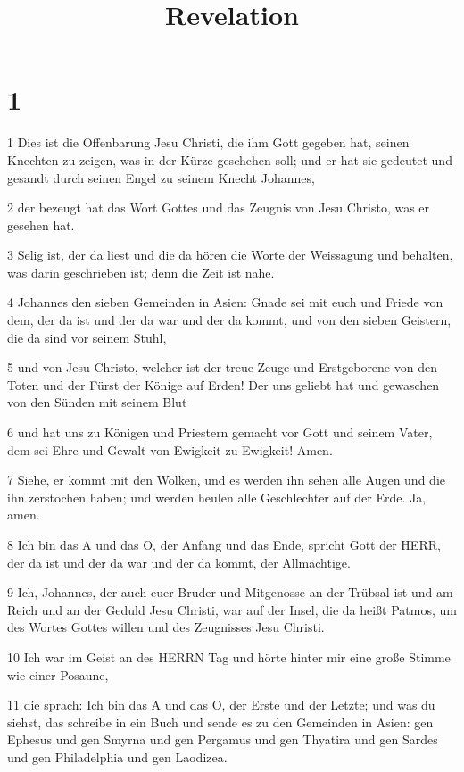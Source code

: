 

\title{Revelation}


\chapter{1}

\par 1 Dies ist die Offenbarung Jesu Christi, die ihm Gott gegeben hat, seinen Knechten zu zeigen, was in der Kürze geschehen soll; und er hat sie gedeutet und gesandt durch seinen Engel zu seinem Knecht Johannes,
\par 2 der bezeugt hat das Wort Gottes und das Zeugnis von Jesu Christo, was er gesehen hat.
\par 3 Selig ist, der da liest und die da hören die Worte der Weissagung und behalten, was darin geschrieben ist; denn die Zeit ist nahe.
\par 4 Johannes den sieben Gemeinden in Asien: Gnade sei mit euch und Friede von dem, der da ist und der da war und der da kommt, und von den sieben Geistern, die da sind vor seinem Stuhl,
\par 5 und von Jesu Christo, welcher ist der treue Zeuge und Erstgeborene von den Toten und der Fürst der Könige auf Erden! Der uns geliebt hat und gewaschen von den Sünden mit seinem Blut
\par 6 und hat uns zu Königen und Priestern gemacht vor Gott und seinem Vater, dem sei Ehre und Gewalt von Ewigkeit zu Ewigkeit! Amen.
\par 7 Siehe, er kommt mit den Wolken, und es werden ihn sehen alle Augen und die ihn zerstochen haben; und werden heulen alle Geschlechter auf der Erde. Ja, amen.
\par 8 Ich bin das A und das O, der Anfang und das Ende, spricht Gott der HERR, der da ist und der da war und der da kommt, der Allmächtige.
\par 9 Ich, Johannes, der auch euer Bruder und Mitgenosse an der Trübsal ist und am Reich und an der Geduld Jesu Christi, war auf der Insel, die da heißt Patmos, um des Wortes Gottes willen und des Zeugnisses Jesu Christi.
\par 10 Ich war im Geist an des HERRN Tag und hörte hinter mir eine große Stimme wie einer Posaune,
\par 11 die sprach: Ich bin das A und das O, der Erste und der Letzte; und was du siehst, das schreibe in ein Buch und sende es zu den Gemeinden in Asien: gen Ephesus und gen Smyrna und gen Pergamus und gen Thyatira und gen Sardes und gen Philadelphia und gen Laodizea.

